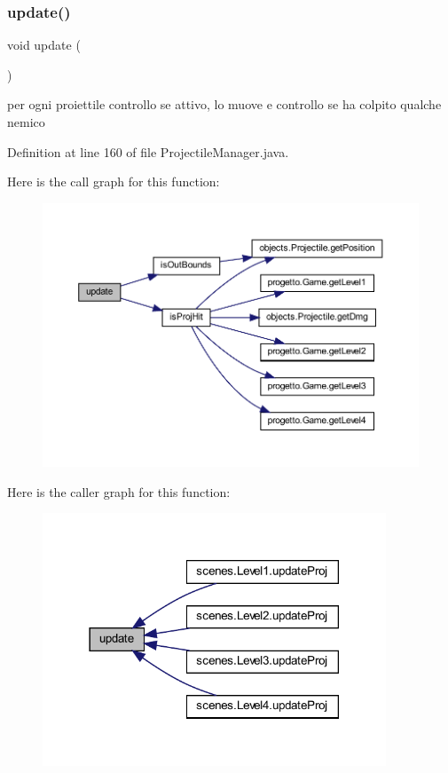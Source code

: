 \subsubsection{\texorpdfstring{update()}{update()}}
{\footnotesize\ttfamily void update (\begin{DoxyParamCaption}{ }\end{DoxyParamCaption})}



per ogni proiettile controllo se attivo, lo muove e controllo se ha colpito qualche nemico 



Definition at line 160 of file Projectile\+Manager.\+java.

Here is the call graph for this function\+:\nopagebreak
\begin{figure}[H]
\begin{center}
\leavevmode
\includegraphics[width=350pt]{classmanagers_1_1_projectile_manager_ac5c54df7ed3b930268c8d7752c101725_cgraph}
\end{center}
\end{figure}
Here is the caller graph for this function\+:\nopagebreak
\begin{figure}[H]
\begin{center}
\leavevmode
\includegraphics[width=290pt]{classmanagers_1_1_projectile_manager_ac5c54df7ed3b930268c8d7752c101725_icgraph}
\end{center}
\end{figure}


